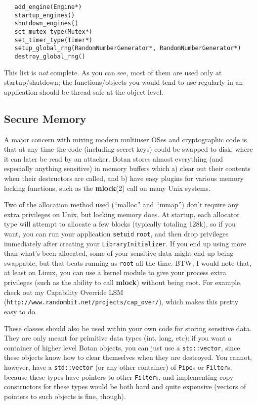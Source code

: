 \documentclass{article}
\newcommand{\function}[1]{\textbf{#1}}
\newcommand{\type}[1]{\texttt{#1}}
\newcommand{\url}[1]{\texttt{#1}}
\begin{document}
\begin{verbatim}
   add_engine(Engine*)
   startup_engines()
   shutdown_engines()
   set_mutex_type(Mutex*)
   set_timer_type(Timer*)
   setup_global_rng(RandomNumberGenerator*, RandomNumberGenerator*)
   destroy_global_rng()
\end{verbatim}

This list is \emph{not} complete. As you can see, most of them are used only at
startup/shutdown; the functions/objects you would tend to use regularly in an
application should be thread safe at the object level.

\subsection{Secure Memory}

A major concern with mixing modern multiuser OSes and cryptographic code is
that at any time the code (including secret keys) could be swapped to disk,
where it can later be read by an attacker. Botan stores almost everything (and
especially anything sensitive) in memory buffers which a) clear out their
contents when their destructors are called, and b) have easy plugins for
various memory locking functions, such as the \function{mlock}(2) call on many
Unix systems.

Two of the allocation method used (``malloc'' and ``mmap'') don't
require any extra privileges on Unix, but locking memory does. At
startup, each allocator type will attempt to allocate a few blocks
(typically totaling 128k), so if you want, you can run your
application \texttt{setuid} \texttt{root}, and then drop privileges
immediately after creating your \type{LibraryInitializer}. If you end
up using more than what's been allocated, some of your sensitive data
might end up being swappable, but that beats running as \texttt{root}
all the time. BTW, I would note that, at least on Linux, you can use a
kernel module to give your process extra privileges (such as the
ability to call \function{mlock}) without being root. For example,
check out my Capability Override LSM
(\url{http://www.randombit.net/projects/cap\_over/}), which makes this
pretty easy to do.

These classes should also be used within your own code for storing sensitive
data. They are only meant for primitive data types (int, long, etc): if you
want a container of higher level Botan objects, you can just use a
\verb|std::vector|, since these objects know how to clear themselves when they
are destroyed. You cannot, however, have a \verb|std::vector| (or any other
container) of \type{Pipe}s or \type{Filter}s, because these types have pointers
to other \type{Filter}s, and implementing copy constructors for these types
would be both hard and quite expensive (vectors of pointers to such objects is
fine, though).
\end{document}
